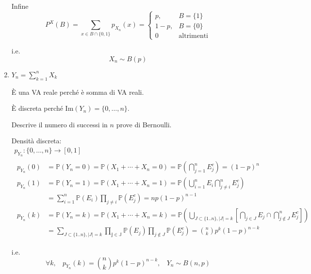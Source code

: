 \begin{enumerate}
Infine\begin{equation*}
P^{X}( B) =\sum\limits _{x\in B\cap \{0,1\}} p_{X_{n}}( x) =\begin{cases}
p, & B=\{1\}\\
1-p, & B=\{0\}\\
0 & \text{altrimenti}
\end{cases}
\end{equation*}

i.e.\begin{equation*}
\boxed{X_{n} \sim B( p)}
\end{equation*}
\item $Y_{n} =\sum\limits _{k=1}^{n} X_{k}$

È una VA reale perché è somma di VA reali.

È discreta perché $\mathrm{Im}( Y_{n}) =\{0,\dotsc ,n\}$.

Descrive il numero di successi in $n$ prove di Bernoulli.

Densità discreta:\begin{gather*}
p_{Y_{n}} :\{0,\dotsc ,n\}\rightarrow [ 0,1]\\
\begin{aligned}
p_{Y_{n}}( 0) & =\mathbb{P}( Y_{n} =0) =\mathbb{P}( X_{1} +\cdots +X_{n} =0) =\mathbb{P}\left(\bigcap _{j=1}^{n} E_{j}^{c}\right) =( 1-p)^{n}\\
p_{Y_{n}}( 1) & =\mathbb{P}( Y_{n} =1) =\mathbb{P}( X_{1} +\cdots +X_{n} =1) =\mathbb{P}\left(\bigcup _{i=1}^{n} E_{i}\bigcap _{j\neq i}^{n} E_{j}^{c}\right)\\
 & =\sum\limits _{i=1}^{n}\mathbb{P}( E_{i})\prod _{j\neq i}\mathbb{P}\left( E_{j}^{c}\right) =np( 1-p)^{n-1}\\
p_{Y_{n}}( k) & =\mathbb{P}( Y_{n} =k) =\mathbb{P}( X_{1} +\cdots +X_{n} =k) =\mathbb{P}\left(\bigcup\limits _{J\subset \{1..n\} ,| J| =k}\left[\bigcap _{j\in J} E_{j} \cap \bigcap _{j\notin J}^{n} E_{j}^{c}\right]\right)\\
 & =\sum\limits _{J\subset \{1..n\} ,| J| =k}\mathbb{\prod _{j\in J} P}( E_{j})\prod _{j\notin J}\mathbb{P}\left( E_{j}^{c}\right) =\binom{n}{k} p^{k}( 1-p)^{n-k}
\end{aligned}
\end{gather*}

i.e.\begin{equation*}
\forall k,\ \ \ \ p_{Y_{n}}\left( k\right) =\binom{n}{k} p^{k}\left( 1-p\right)^{n-k} ,\ \ \ \ Y_{n} \sim B\left( n,p\right)
\end{equation*}


\end{enumerate}
